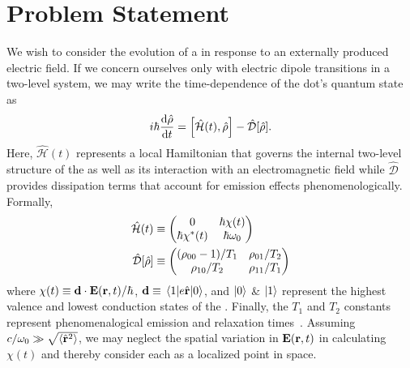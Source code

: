 \section{\label{section:problem statement}Problem Statement}
We wish to consider the evolution of a \qd{} in response to an externally produced electric field.
If we concern ourselves only with electric dipole transitions in a two-level system, we may write the time-dependence of the dot's quantum state as
\begin{equation}
  i \hbar \dv{\hat{\rho}}{t} = \commutator{\hat{\mathcal{H}}(t)}{\hat{\rho}} - \hat{\mathcal{D}}\qty[\hat{\rho}].
  \label{eq:liouville}
\end{equation}
Here, $\hat{\mathcal{H}}(t)$ represents a local Hamiltonian that governs the internal two-level structure of the \qd{} as well as its interaction with an electromagnetic field while $\hat{\mathcal{D}}$ provides dissipation terms that account for emission effects phenomenologically.
Formally,
\begin{subequations}
  \begin{align}
    \hat{\mathcal{H}}(t) &\equiv \mqty(0 & \hbar \chi(t) \\ \hbar \chi^*(t) & \hbar \omega_0) \label{eq:hamiltonian}\\
    \hat{\mathcal{D}}\qty[\hat{\rho}] &\equiv \mqty( \qty(\rho_{00} - 1)/{T_1} & \rho_{01}/{T_2} \\ \rho_{10}/{T_2} & \rho_{11}/T_1 ) \label{eq:dissipator}
  \end{align}
\end{subequations}
where $\chi(t) \equiv \vb{d} \cdot \vb{E}(\vb{r}, t)/\hbar$, $\vb{d} \equiv \matrixel{1}{e \hat{\vb{r}}}{0}$, and $\ket{0}$ \& $\ket{1}$ represent the highest valence and lowest conduction states of the \qd{}.
Finally, the $T_1$ and $T_2$ constants represent phenomenalogical emission and relaxation times~\cite{}.
Assuming $c/\omega_0 \gg \sqrt{\expval{\hat{\vb{r}}^2}}$, we may neglect the spatial variation in $\vb{E}(\vb{r}, t)$ in calculating $\chi(t)$ and thereby consider each \qd{} as a localized point in space.

